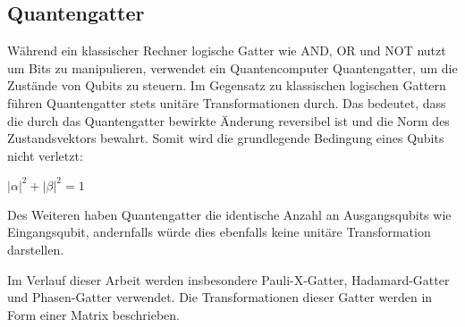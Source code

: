 \subsection{Quantengatter}
Während ein klassischer Rechner logische Gatter wie AND, OR und NOT nutzt um Bits zu manipulieren, 
verwendet ein Quantencomputer Quantengatter, 
um die Zustände von Qubits zu steuern. 
Im Gegensatz zu klassischen logischen Gattern führen Quantengatter stets unitäre Transformationen durch. 
Das bedeutet, dass die durch das Quantengatter bewirkte Änderung reversibel ist und 
die Norm des Zustandsvektors bewahrt. 
Somit wird die grundlegende Bedingung eines Qubits nicht verletzt:
\begin{center}
\(\lvert\alpha\rvert^2 + \lvert\beta\rvert^2 = 1\)
\end{center}
Des Weiteren haben Quantengatter die identische Anzahl an Ausgangsqubits wie Eingangsqubit, 
andernfalls würde dies ebenfalls keine unitäre Transformation darstellen.

Im Verlauf dieser Arbeit werden insbesondere Pauli-X-Gatter, Hadamard-Gatter und Phasen-Gatter verwendet. 
Die Transformationen dieser Gatter werden in Form einer Matrix beschrieben.

